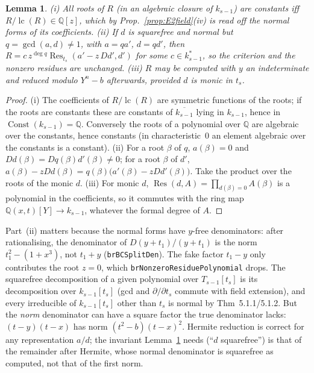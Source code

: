 \documentclass[11pt]{article}
\newtheorem{lemma}[theorem]{Lemma}
\theoremstyle{definition}
\theoremstyle{remark}
\newcommand{\Q}{\mathbb{Q}}
\newcommand{\lc}{\operatorname{lc}}
\newcommand{\code}[1]{\texttt{#1}}
\begin{document}
\begin{lemma}\label{lem:E2const}
(i) All roots of $R$ (in an algebraic closure of $k_{s-1}$) are constants iff
$R/\lc(R)\in\Q[z]$, which by Prop.~\ref{prop:E2field}(iv) is read off the normal forms of
its coefficients. (ii) If $d$ is squarefree and normal but $q=\gcd(a,d)\ne1$, with
$a=qa'$, $d=qd'$, then $R=c\,z^{\deg q}\operatorname{Res}_{t_s}(a'-z\,Dd',d')$ for some
$c\in k_{s-1}^*$, so the criterion and the nonzero residues are unchanged.
(iii) $R$ may be computed with $y$ an indeterminate and reduced modulo $Y^n-b$ afterwards,
provided $d$ is monic in $t_s$.
\end{lemma}
\begin{proof}
(i) The coefficients of $R/\lc(R)$ are symmetric functions of the roots; if the roots are
constants these are constants of $\overline{k_{s-1}}$ lying in $k_{s-1}$, hence in
$\operatorname{Const}(k_{s-1})=\Q$. Conversely the roots of a polynomial over $\Q$ are algebraic
over the constants, hence constants (in characteristic~0 an element algebraic over the
constants is a constant). (ii) For a root $\beta$ of $q$,
$a(\beta)=0$ and $Dd(\beta)=Dq(\beta)d'(\beta)\ne0$; for a root $\beta$ of $d'$,
$a(\beta)-zDd(\beta)=q(\beta)\bigl(a'(\beta)-zDd'(\beta)\bigr)$. Take the product over the
roots of the monic $d$. (iii) For monic $d$, $\operatorname{Res}(d,A)=\prod_{d(\beta)=0}A(\beta)$
is a polynomial in the coefficients, so it commutes with the ring map
$\Q(x,t)[Y]\to k_{s-1}$, whatever the formal degree of $A$.
\end{proof}

Part~(ii) matters because the normal forms have $y$-free denominators: after rationalising,
the denominator of $D(y+t_1)/(y+t_1)$ is the norm $t_1^2-(1+x^3)$, not $t_1+y$
(\code{brBCSplitDen}). The fake factor $t_1-y$ only contributes the root $z=0$, which
\code{brNonzeroResiduePolynomial} drops. The squarefree decomposition of a given
polynomial over $T_{s-1}[t_s]$ is its decomposition over $k_{s-1}[t_s]$ (gcd and
$\partial/\partial t_s$ commute with field extension), and every irreducible of
$k_{s-1}[t_s]$ other than $t_s$ is normal by Thm~5.1.1/5.1.2. But the \emph{norm}
denominator can have a square factor the true denominator lacks: $(t-y)(t-x)$ has norm
$(t^2-b)(t-x)^2$. Hermite reduction is correct for any representation $a/d$; the invariant
Lemma~\ref{lem:E2const} needs (``$d$ squarefree'') is that of the remainder after Hermite,
whose normal denominator is squarefree as computed, not that of the first norm.
\end{document}
